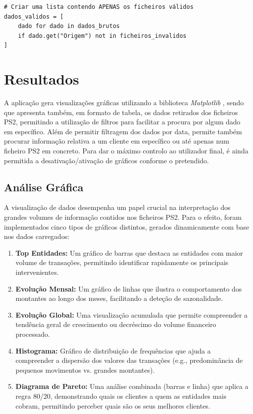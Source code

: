 \documentclass[12pt, a4paper]{article}
\begin{document}
\begin{lstlisting}[caption={Filtragem de dados inválidos}, label={lst:filter}]
# Criar uma lista contendo APENAS os ficheiros válidos
dados_validos = [
    dado for dado in dados_brutos
    if dado.get("Origem") not in ficheiros_invalidos
]
\end{lstlisting}

\section{Resultados}
A aplicação gera visualizações gráficas utilizando a biblioteca \textit{Matplotlib} \cite{hunter2007}, sendo que apresenta também, em formato de tabela, os dados retirados dos ficheiros PS2, permitindo a utilização de filtros para facilitar a procura por algum dado em específico.
Além de permitir filtragem dos dados por data, permite também procurar informação relativa a um cliente em específico ou até apenas num ficheiro PS2 em concreto.
Para dar o máximo controlo ao utilizador final, é ainda permitida a desativação/ativação de gráficos conforme o pretendido.

\subsection{Análise Gráfica}
A visualização de dados desempenha um papel crucial na interpretação dos grandes volumes de informação contidos nos ficheiros PS2. Para o efeito, foram implementados cinco tipos de gráficos distintos, gerados dinamicamente com base nos dados carregados:

\begin{enumerate}
    \item \textbf{Top Entidades:} Um gráfico de barras que destaca as entidades com maior volume de transações, permitindo identificar rapidamente os principais intervenientes.
    \item \textbf{Evolução Mensal:} Um gráfico de linhas que ilustra o comportamento dos montantes ao longo dos meses, facilitando a deteção de sazonalidade.
    \item \textbf{Evolução Global:} Uma visualização acumulada que permite compreender a tendência geral de crescimento ou decréscimo do volume financeiro processado.
    \item \textbf{Histograma:} Gráfico de distribuição de frequências que ajuda a compreender a dispersão dos valores das transações (e.g., predominância de pequenos movimentos vs. grandes montantes).
    \item \textbf{Diagrama de Pareto:} Uma análise combinada (barras e linha) que aplica a regra 80/20, demonstrando quais os clientes a quem as entidades mais cobram, permitindo perceber quais são os seus melhores clientes.
\end{enumerate}
\end{document}
